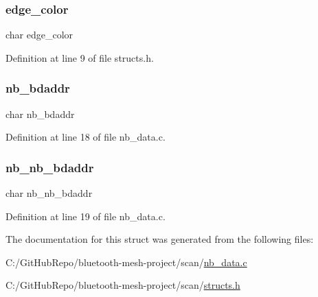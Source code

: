 \mbox{\label{structnb__object_a888ab9b7cd2c4e983eea9cc143ff0e3c}} 
\subsubsection{\texorpdfstring{edge\+\_\+color}{edge\_color}}
{\footnotesize\ttfamily char edge\+\_\+color}



Definition at line 9 of file structs.\+h.

\mbox{\label{structnb__object_a1797d4245f78fe23bc470bba211a1f08}} 
\subsubsection{\texorpdfstring{nb\+\_\+bdaddr}{nb\_bdaddr}}
{\footnotesize\ttfamily char nb\+\_\+bdaddr}



Definition at line 18 of file nb\+\_\+data.\+c.

\mbox{\label{structnb__object_a0de8d8aea3afc19931b2be5aee3b160e}} 
\subsubsection{\texorpdfstring{nb\+\_\+nb\+\_\+bdaddr}{nb\_nb\_bdaddr}}
{\footnotesize\ttfamily char nb\+\_\+nb\+\_\+bdaddr}



Definition at line 19 of file nb\+\_\+data.\+c.



The documentation for this struct was generated from the following files\+:\begin{DoxyCompactItemize}
\item 
C\+:/\+Git\+Hub\+Repo/bluetooth-\/mesh-\/project/scan/\mbox{\hyperlink{scan_2nb__data_8c}{nb\+\_\+data.\+c}}\item 
C\+:/\+Git\+Hub\+Repo/bluetooth-\/mesh-\/project/scan/\mbox{\hyperlink{scan_2structs_8h}{structs.\+h}}\end{DoxyCompactItemize}
